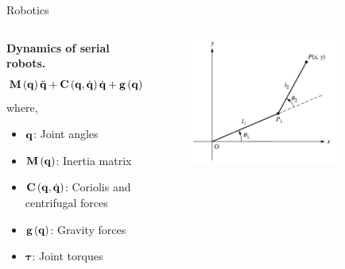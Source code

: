 \documentclass[aspectratio=169]{beamer}
\let\olditem\item
\renewcommand{\item}{\setlength{\itemsep}{\fill}\olditem}
\def\mf{\ensuremath\mathbf}
\def\lp{\ensuremath\left(}
\def\rp{\ensuremath\right)}
\newcommand{\ct}[1]{\lp #1\rp}
\begin{document}
\begin{frame}{Robotics}
  \begin{columns}
    \begin{column}{0.5\textwidth}
      \textbf{Dynamics of serial robots.}
      \[ 
        \mf{M}\ct{\mf{q}} \ddot{\mf{q}} + \mf{C}\ct{\mf{q}, \dot{\mf{q}}} \dot{\mf{q}} + \mf{g}\ct{\mf{q}} = \bm{\tau} + \mf{J}^\top \mf{f}
      \]
      where,
      \begin{itemize}
        \item $\mf{q}$: Joint angles
        \item $\mf{M}\ct{\mf{q}}$: Inertia matrix
        \item $\mf{C}\ct{\mf{q}, \dot{\mf{q}}}$: Coriolis and centrifugal forces
        \item $\mf{g}\ct{\mf{q}}$: Gravity forces
        \item $\bm{\tau}$: Joint torques
      \end{itemize}
      
    \end{column}
    \begin{column}{0.45\textwidth}
      \begin{figure}
        \centering
        \includegraphics[width=0.8\textwidth]{2links.png}
      \end{figure}
    \end{column}    
  \end{columns}
\end{frame}
\end{document}
